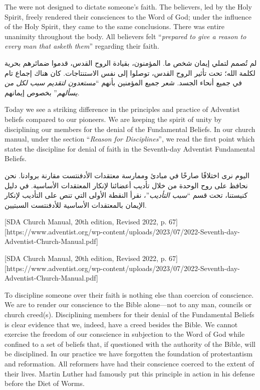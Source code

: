 The  were not designed to dictate someone’s faith. The believers, led by the Holy Spirit, freely rendered their consciences to the Word of God; under the influence of the Holy Spirit, they came to the same conclusions. There was entire unanimity throughout the body. All believers felt “\textit{prepared to give a reason to every man that asketh them}” regarding their faith.


لم تُصمم  لتملي إيمان شخص ما. المؤمنون، بقيادة الروح القدس، قدموا ضمائرهم بحرية لكلمة الله؛ تحت تأثير الروح القدس، توصلوا إلى نفس الاستنتاجات. كان هناك إجماع تام في جميع أنحاء الجسد. شعر جميع المؤمنين بأنهم “\textit{مستعدون لتقديم سبب لكل من يسألهم}” بخصوص إيمانهم.


Today we see a striking difference in the principles and practice of Adventist beliefs compared to our pioneers. We are keeping the spirit of unity by disciplining our members for the denial of the Fundamental Beliefs. In our church manual, under the section “\textit{Reason for Disciplines}”, we read the first point which states the discipline for denial of faith in the Seventh-day Adventist Fundamental Beliefs.


اليوم نرى اختلافًا صارخًا في مبادئ وممارسة معتقدات الأدفنتست مقارنة بروادنا. نحن نحافظ على روح الوحدة من خلال تأديب أعضائنا لإنكار المعتقدات الأساسية. في دليل كنيستنا، تحت قسم “\textit{سبب التأديب}”، نقرأ النقطة الأولى التي تنص على التأديب لإنكار الإيمان بالمعتقدات الأساسية للأدفنتست السبتيين.






[SDA Church Manual, 20th edition, Revised 2022, p. 67][https://www.adventist.org/wp-content/uploads/2023/07/2022-Seventh-day-Adventist-Church-Manual.pdf]


[SDA Church Manual, 20th edition, Revised 2022, p. 67][https://www.adventist.org/wp-content/uploads/2023/07/2022-Seventh-day-Adventist-Church-Manual.pdf]


To discipline someone over their faith is nothing else than coercion of conscience. We are to render our conscience to the Bible alone—not to any man, councils or church creed(s). Disciplining members for their denial of the Fundamental Beliefs is clear evidence that we, indeed, have a creed besides the Bible. We cannot exercise the freedom of our conscience in subjection to the Word of God while confined to a set of beliefs that, if questioned with the authority of the Bible, will be disciplined. In our practice we have forgotten the foundation of protestantism and reformation. All reformers have had their conscience coerced to the extent of their lives. Martin Luther had famously put this principle in action in his defense before the Diet of Worms.


